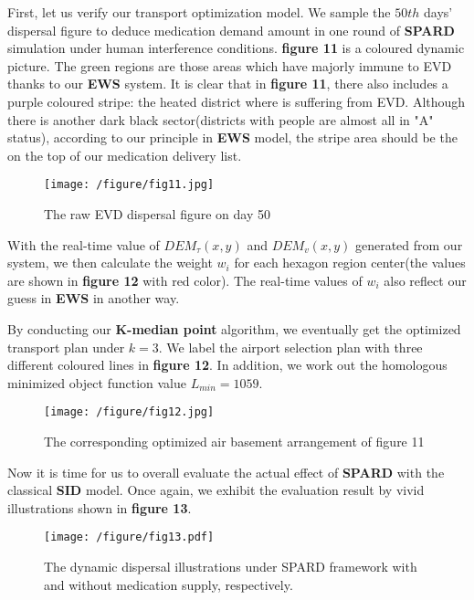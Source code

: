{First, let us verify our transport optimization model. We sample the $50th$ days' dispersal figure to deduce medication demand amount in one round of \textbf{SPARD} simulation under human interference conditions. \textbf{figure 11} is a coloured dynamic picture. The green regions are those areas which have majorly immune to EVD thanks to our \textbf{EWS} system. It is clear that in \textbf{figure 11}, there also includes a purple coloured stripe: the heated district where is suffering from EVD. Although there is another dark black sector(districts with people are almost all in "A" status), according to our principle in \textbf{EWS} model, the stripe area should be the on the top of our medication delivery list. 

\begin{figure}[htbp]
\centering
\texttt{[image: /figure/fig11.jpg]}
\caption{The raw EVD dispersal figure on day 50}\label{fig:11}
\end{figure}

With the real-time value of $DEM_{\tau}(x,y)$ and $DEM_{v}(x,y)$ generated from our system,  we then calculate the weight $w_{i}$ for each hexagon region center(the values are shown in \textbf{figure 12} with red color). The real-time values of $w_{i}$ also reflect our guess in \textbf{EWS} in another way.

By conducting our \textbf{K-median point} algorithm, we eventually get the optimized transport plan under $k=3$. We label the airport selection plan with three different coloured lines in \textbf{figure 12}. In addition, we work out the homologous minimized object function value $L_{min}=1059$.

\begin{figure}[htbp]
\centering
\texttt{[image: /figure/fig12.jpg]}
\caption{The corresponding optimized air basement arrangement of figure 11}
\end{figure}

Now it is time for us to overall evaluate the actual effect of \textbf{SPARD} with the classical \textbf{SID} model. Once again, we exhibit the evaluation result by vivid illustrations shown in \textbf{figure 13}.

\begin{figure}[htbp]
\centering
\texttt{[image: /figure/fig13.pdf]}
\caption{The dynamic dispersal illustrations under SPARD framework with and without medication supply, respectively.}
\end{figure}

}

